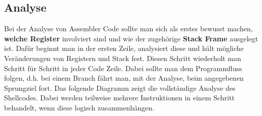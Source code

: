 \documentclass[12pt]{article}
\begin{document}
\subsection{Analyse}
Bei der Analyse von Assembler Code sollte man sich als erstes bewusst machen, \textbf{welche Register} involviert sind und wie der zugehörige \textbf{Stack Frame} ausgelegt ist. Dafür beginnt man in der ersten Zeile, analysiert diese und hält mögliche Veränderungen von Registern und Stack fest. Diesen Schritt wiederholt man Schritt für Schritt in jeder Code Zeile. Dabei sollte man dem Programmfluss folgen, d.h. bei einem Branch fährt man, mit der Analyse, beim angegebenen Sprungziel fort.
\newline
\newline
Das folgende Diagramm zeigt die vollständige Analyse des Shellcodes. Dabei werden teilweise mehrere Instruktionen in einem Schritt behandelt, wenn diese logisch zusammenhängen.
\newline
\end{document}
